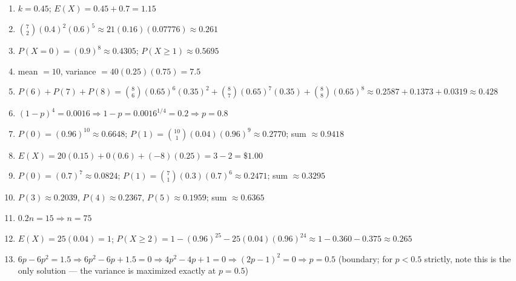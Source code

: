 \documentclass[11pt]{article}
\begin{document}
\begin{keybox}
\begin{multicols}{2}
\small
\begin{enumerate}[leftmargin=*,itemsep=3pt]
  \item $k=0.45$; $E(X)=0.45+0.7=1.15$
  \item $\binom72(0.4)^2(0.6)^5\approx21(0.16)(0.07776)\approx0.261$
  \item $P(X=0)=(0.9)^8\approx0.4305$; $P(X\geq1)\approx0.5695$
  \item mean $=10$, variance $=40(0.25)(0.75)=7.5$
  \item $P(6)+P(7)+P(8)=\binom86(0.65)^6(0.35)^2+\binom87(0.65)^7(0.35)+\binom88(0.65)^8\approx0.2587+0.1373+0.0319\approx0.428$
  \item $(1-p)^4=0.0016\Rightarrow1-p=0.0016^{1/4}=0.2\Rightarrow p=0.8$
  \item $P(0)=(0.96)^{10}\approx0.6648$; $P(1)=\binom{10}1(0.04)(0.96)^9\approx0.2770$; sum $\approx0.9418$
  \item $E(X)=20(0.15)+0(0.6)+(-8)(0.25)=3-2=\$1.00$
  \item $P(0)=(0.7)^7\approx0.0824$; $P(1)=\binom71(0.3)(0.7)^6\approx0.2471$; sum $\approx0.3295$
  \item $P(3)\approx0.2039$, $P(4)\approx0.2367$, $P(5)\approx0.1959$; sum $\approx0.6365$
  \item $0.2n=15\Rightarrow n=75$
  \item $E(X)=25(0.04)=1$; $P(X\geq2)=1-(0.96)^{25}-25(0.04)(0.96)^{24}\approx1-0.360-0.375\approx0.265$
  \item $6p-6p^2=1.5\Rightarrow6p^2-6p+1.5=0\Rightarrow4p^2-4p+1=0\Rightarrow(2p-1)^2=0\Rightarrow p=0.5$ (boundary; for $p<0.5$ strictly, note this is the only solution --- the variance is maximized exactly at $p=0.5$)
\end{enumerate}
\end{multicols}
\end{keybox}
\end{document}
